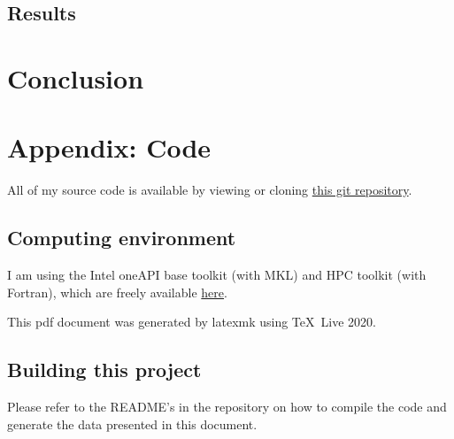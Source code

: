 \documentclass{article}
\begin{document}
\subsection{
Results
}



\newpage

\section{
Conclusion
}



\newpage

\section{
Appendix: Code
}

All of my source code is available by viewing or cloning
\href{https://github.com/lxvm/ph121c.git}{this git repository}.

\subsection{
Computing environment
}

I am using the Intel oneAPI base toolkit (with MKL)
and HPC toolkit (with Fortran), which are freely available
\href{https://software.intel.com/content/www/us/en/develop/
articles/free-intel-software-developer-tools.html}{here}.

This pdf document was generated by latexmk using \TeX\ Live 2020.

\subsection{
Building this project
}

Please refer to the README's in the repository on how to compile the
code and generate the data presented in this document.
\end{document}

